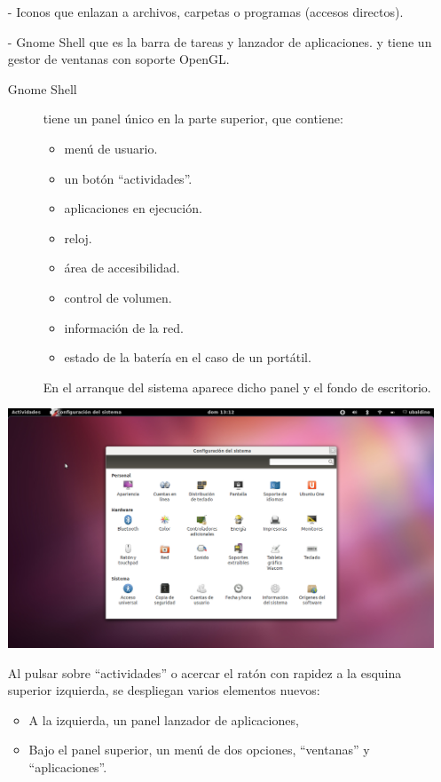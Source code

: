 \begin{itemize}
\item[-] Iconos que enlazan a archivos, carpetas o programas (accesos directos).
\item[-] Gnome Shell que es la barra de tareas y lanzador de aplicaciones. y tiene un gestor de ventanas con soporte OpenGL.
\begin{description}
\item[Gnome Shell] tiene un panel único en la parte superior, que contiene:
\begin{itemize}
 \item menú de usuario. 
 \item un botón “actividades”. 
 \item aplicaciones en ejecución.
 \item reloj.
 \item área de accesibilidad.
 \item control de volumen.
 \item información de la red.
 \item estado de la batería en el caso de un portátil.
\end{itemize}
En el arranque del sistema aparece dicho panel y el fondo de escritorio.
\end{description}
\begin{center}
\includegraphics[scale=0.3]{img/Pantallazo3.png}
\end{center}
Al pulsar sobre “actividades” o acercar el ratón con rapidez a la esquina superior izquierda, se despliegan varios elementos nuevos:
\begin{itemize}
\item A la izquierda, un panel lanzador de aplicaciones,
\item Bajo el panel superior, un menú de dos opciones, “ventanas” y “aplicaciones”.

\end{itemize}
\end{itemize}
